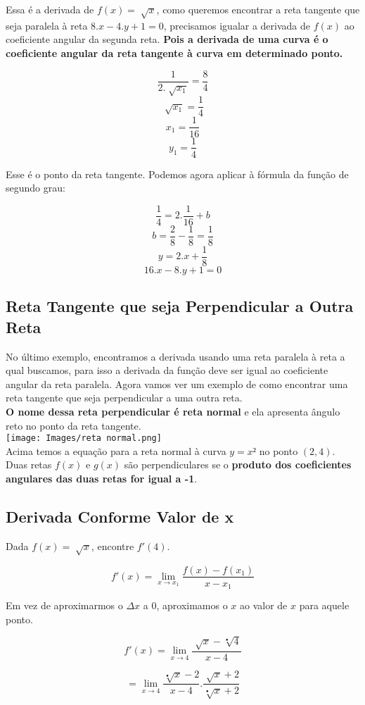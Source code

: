 \documentclass[ ]{article}
\begin{document}
		Essa é a derivada de $f(x) = \sqrt[ ]{x}$, como queremos encontrar a reta tangente que seja paralela à reta $8.x-4.y+1=0$, precisamos igualar a derivada de $f(x)$ ao coeficiente angular da segunda reta. \textbf{Pois a derivada de uma curva é o coeficiente angular da reta tangente à curva em determinado ponto.}
		
		$$\dfrac{1}{2.\sqrt[ ]{x_1}}=\dfrac{8}{4}$$
		$$\sqrt[ ]{x_1}=\dfrac{1}{4}$$
		$$x_1 = \dfrac{1}{16}$$
		$$y_1 = \dfrac{1}{4}$$

		Esse é o ponto da reta tangente. Podemos agora aplicar à fórmula da função de segundo grau:

		$$\dfrac{1}{4}=2.\dfrac{1}{16}+b$$
		$$b =\dfrac{2}{8}-\dfrac{1}{8}=\dfrac{1}{8}$$
		$$y=2.x+\dfrac{1}{8}$$
		$$16.x-8.y+1=0$$
		
	\subsection{Reta Tangente que seja Perpendicular a Outra Reta}
		No último exemplo, encontramos a derivada usando uma reta paralela à reta a qual buscamos, para isso a derivada da função deve ser igual ao coeficiente angular da reta paralela. Agora vamos ver um exemplo de como encontrar uma reta tangente que seja perpendicular a uma outra reta.\\
		\textbf{O nome dessa reta perpendicular é reta normal} e ela apresenta ângulo reto no ponto da reta tangente.\\
		\texttt{[image: Images/reta normal.png]}
		\\
		Acima temos a equação para a reta normal à curva $y = x²$ no ponto $(2,4)$.\\
		Duas retas $f(x)$ e $g(x)$ são perpendiculares se o \textbf{produto dos coeficientes angulares das duas retas for igual a -1}.

	\subsection{Derivada Conforme Valor de x}
	Dada $f(x)=\sqrt[]{x}$, encontre $f'(4)$.

	$$f'(x)=\lim_{x\to x_1}\dfrac{f(x)-f(x_1)}{x-x_1}$$	

	Em vez de aproximarmos o $\Delta x$ a $0$, aproximamos o $x$ ao valor de $x$ para aquele ponto.

	$$f'(x) = \lim_{x\to 4}\dfrac{\sqrt[ ]{x}-\sqrt[•]{4}}{x-4}$$
	
	$$= \lim_{x\to 4}\dfrac{\sqrt[•]{x}-2}{x-4}.\dfrac{\sqrt[]{x}+2}{\sqrt[•]{x}+2}$$
	
\end{document}
